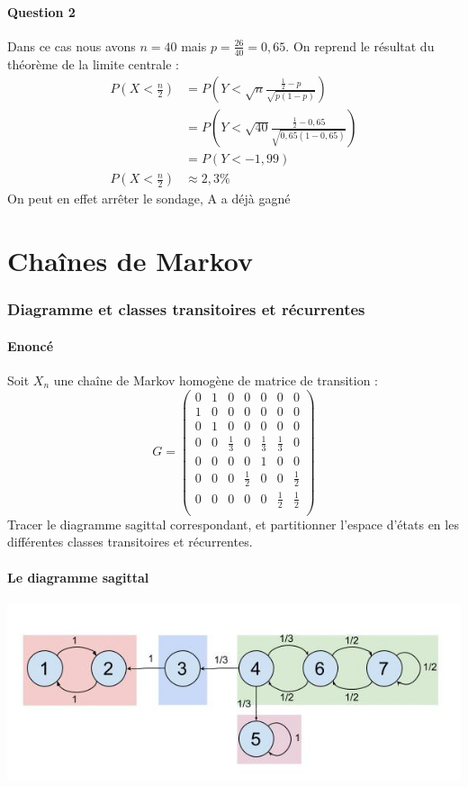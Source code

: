 \documentclass[10pt,a4paper,twoside]{article}
\begin{document}
\subsection{Question 2}
Dans ce cas nous avons $n=40$ mais $p=\frac{26}{40}=0,65$. On reprend le résultat du théorème de la limite centrale :
\begin{align*}
P\left(X<\frac{n}{2}\right) &= P\left(Y<\sqrt{n}\frac{\frac{1}{2}-p}{\sqrt{p(1-p)}}\right)\\
&= P\left(Y<\sqrt{40}\frac{\frac{1}{2}-0,65}{\sqrt{0,65(1-0,65)}}\right)\\
&= P(Y<-1,99)\\
P\left(X<\frac{n}{2}\right)&\approx 2,3\%
\end{align*}
On peut en effet arrêter le sondage, A a déjà gagné

\newpage
\part{Chaînes de Markov}
\setcounter{section}{0}
\section{Diagramme et classes transitoires et récurrentes}
\subsection*{Enoncé}
Soit $X_{n}$ une chaîne de Markov homogène de matrice de transition :
\[ G=\left(\begin{array}{lllllll}
0 & 1 & 0 & 0 & 0 & 0 & 0\\
1 & 0 & 0 & 0 & 0 & 0 & 0\\
0 & 1 & 0 & 0 & 0 & 0 & 0\\
0 & 0 & \frac{1}{3} & 0 & \frac{1}{3} & \frac{1}{3} & 0\\
0 & 0 & 0 & 0 & 1 & 0 & 0\\
0 & 0 & 0 & \frac{1}{2} & 0 & 0 & \frac{1}{2}\\
0 & 0 & 0 & 0 & 0 & \frac{1}{2} & \frac{1}{2}\\
\end{array}\right)  \]
Tracer le diagramme sagittal correspondant, et partitionner l'espace d'états en les différentes classes transitoires et récurrentes.

\subsection{Le diagramme sagittal}
\includegraphics[scale=0.5]{ProbaTD8ex1.jpg}  
\end{document}
